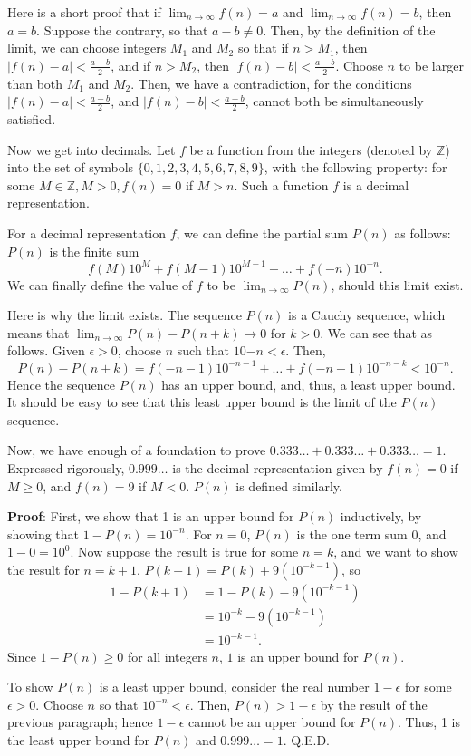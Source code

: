 Here is a short proof that if $\lim_{n \to \infty}f(n) = a$ and $\lim_{n \to \infty}f(n) = b$, then $a = b$. Suppose the contrary, so that $a - b\neq 0$. Then, by the definition of the limit, we can choose integers $M_1$ and $M_2$ so that if $n > M_1$, then $|f(n)-a| < \frac{a-b}{2}$, and if $n > M_2$, then $|f(n)-b| < \frac{a-b}{2}$. Choose $n$ to be larger than both $M_1$ and $M_2$. Then, we have a contradiction, for the conditions $|f(n)-a| < \frac{a-b}{2}$, and $|f(n)-b| < \frac{a-b}{2}$, cannot both be simultaneously satisfied.

Now we get into decimals. Let $f$ be a function from the integers (denoted by $\mathbb{Z}$) into the set of symbols $\{0,1,2,3,4,5,6,7,8,9\}$, with the following property: for some $M \in \mathbb{Z}, M > 0, f(n) = 0$ if $M > n$. Such a function $f$ is a decimal representation.

For a decimal representation $f$, we can define the partial sum $P(n)$ as follows: $P(n)$ is the finite sum 
\begin{equation}
f(M)10^M + f(M-1)10^{M-1} + \dots + f(-n)10^{-n}.
\end{equation}
We can finally define the value of $f$ to be $\lim_{n\to \infty}P(n)$, should this limit exist.

Here is why the limit exists. The sequence $P(n)$ is a Cauchy sequence, which means that $\lim_{n\to \infty} P(n)-P(n+k) \to 0$ for $k > 0$. We can see that as follows. Given $\epsilon > 0$, choose $n$ such that $10{-n} < \epsilon$. Then,
\begin{equation}
P(n)-P(n+k) = f(-n-1)10^{-n-1} + \dots + f(-n-1)10^{-n-k} < 10^{-n}. 
\end{equation}
Hence the sequence $P(n)$ has an upper bound, and, thus, a least upper bound. It should be easy to see that this least upper bound is the limit of the $P(n)$ sequence.

Now, we have enough of a foundation to prove $0.333\dotsc + 0.333\dotsc + 0.333\dotsc = 1$. Expressed rigorously, $0.999\dotsc$ is the decimal representation given by $f(n) = 0$ if $M \geq 0$, and $f(n) = 9$ if $M < 0$. $P(n)$ is defined similarly.

\textbf{Proof}: First, we show that 1 is an upper bound for $P(n)$ inductively, by showing that $1 - P(n) = 10^{-n}$. For $n = 0$, $P(n)$ is the one term sum 0, and $1-0 = 10^0$. Now suppose the result is true for some $n = k$, and we want to show the result for $n = k+1$. $P(k+1) = P(k) + 9(10^{-k-1})$, so 
\begin{align}
1-P(k+1) &= 1 - P(k) - 9(10^{-k-1})\\
&= 10^{-k} - 9(10^{-k-1}) \\
&= 10^{-k-1}.
\end{align}
Since $1-P(n) \geq 0$ for all integers $n$, $1$ is an upper bound for $P(n)$.

To show $P(n)$ is a least upper bound, consider the real number $1-\epsilon$ for some $\epsilon > 0$. Choose $n$ so that $10^{-n} < \epsilon$. Then, $P(n) > 1-\epsilon$ by the result of the previous paragraph; hence $1-\epsilon$ cannot be an upper bound for $P(n)$. Thus, 1 is the least upper bound for $P(n)$ and $0.999\dotsc = 1$. Q.E.D.